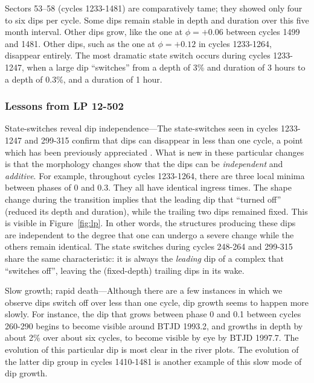 \documentclass[11pt,twocolumn,tighten]{aastex63}
\begin{document}
Sectors 53--58 (cycles 1233-1481) are comparatively tame; they showed
only four to six dips per cycle.  Some dips remain stable in depth and
duration over this five month interval.  Other dips grow, like the one
at $\phi = +0.06$ between cycles 1499 and 1481.  Other dips, such as
the one at $\phi = +0.12$ in cycles 1233-1264, disappear entirely.
The most dramatic state switch occurs during cycles 1233-1247, when a
large dip ``switches'' from a depth of 3\% and duration of 3 hours to
a depth of 0.3\%, and a duration of 1 hour.


\subsubsection{Lessons from LP 12-502}
\label{subsec:lplessons}

{\sc State-switches reveal dip independence}---The state-switches seen
in cycles 1233-1247 and 299-315 confirm that dips can disappear in
less than one cycle, a point which has been previously appreciated
\citep{2017AJ....153..152S}.  What is new in these particular changes
is that the morphology changes show that the dips can be {\it
independent} and {\it additive}.  For example, throughout cycles
1233-1264, there are three local minima between phases of 0 and 0.3.
They all have identical ingress times.  The shape change during the
transition implies that the leading dip that ``turned off'' (reduced
its depth and duration), while the trailing two dips remained fixed.
This is visible in Figure~\ref{fig:lp}.  In other words, the
structures producing these dips are independent to the degree that one
can undergo a severe change while the others remain identical.  The
state switches during cycles 248-264 and 299-315 share the same
characteristic: it is always the {\it leading} dip of a complex that
``switches off'', leaving the (fixed-depth) trailing dips in its wake.

{\sc Slow growth; rapid death}---Although there are a few instances in
which we observe dips switch off over less than one cycle, dip growth
seems to happen more slowly.  For instance, the dip that grows between
phase 0 and 0.1 between cycles 260-290 begins to become visible around
BTJD 1993.2, and growths in depth by about 2\% over about six cycles,
to become visible by eye by BTJD 1997.7.  The evolution of this
particular dip is most clear in the river plots.  The evolution of the
latter dip group in cycles 1410-1481 is another example of this slow
mode of dip growth.

\end{document}
